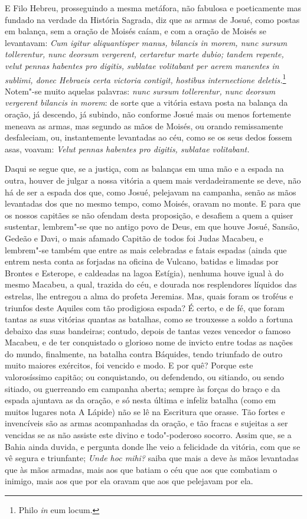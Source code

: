 E Filo Hebreu, prosseguindo a mesma metáfora, não
fabulosa e poeticamente mas fundado na verdade da História Sagrada, diz
que as armas de Josué, como postas em balança, sem a oração de Moisés
caíam, e com a oração de Moisés se levantavam: \emph{Cum igitur
aliquantisper manus, bilancis in morem, nunc sursum tollerentur, nunc
deorsum vergerent, certaretur marte dubio; tandem repente, velut pennas
habentes pro digitis, sublatae volitabant per aerem manentes in sublimi,
donec Hebraeis certa victoria contigit, hostibus internectione deletis.}\footnote{Philo \textit{in} eum locum.}
Notem"-se muito aquelas palavras: \emph{nunc sursum
tollerentur, nunc deorsum vergerent bilancis in morem}: de sorte que a
vitória estava posta na balança da oração, já descendo, já subindo, não
conforme Josué mais ou menos fortemente meneava as
armas, mas segundo as mãos de Moisés, ou orando remissamente
desfaleciam, ou, instantemente levantadas ao céu, como se os seus dedos
fossem asas, voavam: \emph{Velut pennas habentes pro digitis, sublatae
volitabant.}

Daqui se segue que, se a justiça, com as balanças em uma mão e a espada
na outra, houver de julgar a nossa vitória a quem mais verdadeiramente
se deve, não há de ser a espada dos que, como Josué, pelejavam na
campanha, senão as mãos levantadas dos que no mesmo tempo, como Moisés,
oravam no monte. E para que os nossos capitães se não ofendam desta
proposição, e desafiem a quem a quiser sustentar, lembrem"-se que no
antigo povo de Deus, em que houve Josué, Sansão, Gedeão e Davi, o mais
afamado Capitão de todos foi Judas Macabeu, e lembrem"-se também que
entre as mais celebradas e fatais espadas (ainda que entrem nesta conta
as forjadas na oficina de Vulcano, batidas e limadas por Brontes e
Esterope, e caldeadas na lagoa Estígia), nenhuma houve igual à do mesmo
Macabeu, a qual, trazida do céu, e dourada nos resplendores líquidos das
estrelas, lhe entregou a alma do profeta Jeremias. Mas, quais foram os
troféus e triunfos deste Aquiles com tão prodigiosa espada?
É certo, e de fé, que foram tantas as suas vitórias quantas as batalhas,
como se trouxesse a soldo a fortuna debaixo das suas bandeiras; contudo,
depois de tantas vezes vencedor o famoso Macabeu, e de ter conquistado o
glorioso nome de invicto entre todas as nações do mundo, finalmente, na
batalha contra Báquides, tendo triunfado de outro muito maiores
exércitos, foi vencido e modo. E por quê? Porque este valorosíssimo
capitão; ou conquistando, ou defendendo, ou sitiando, ou sendo sitiado,
ou guerreando em campanha aberta; sempre às forças do braço e da espada
ajuntava as da oração, e só nesta última e infeliz batalha (como em
muitos lugares nota A Lápide) não se lê na Escritura que orasse. Tão
fortes e invencíveis são as armas acompanhadas da oração, e tão fracas e
sujeitas a ser vencidas se as não assiste este divino e todo"-poderoso
socorro. Assim que, se a Bahia ainda duvida, e pergunta donde lhe veio a
felicidade da vitória, com que se vê segura e triunfante; \emph{Unde hoc
mihi?} saiba que mais a deve às mãos levantadas que às mãos armadas,
mais aos que batiam o céu que aos que combatiam o inimigo, mais aos que
por ela oravam que aos que pelejavam por ela.

